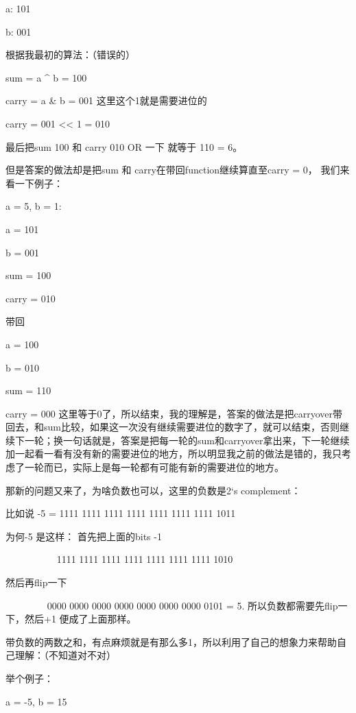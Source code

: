 \documentclass[9pt, b5paaper]{book}
\begin{document}
a: 101

b: 001

根据我最初的算法：（错误的）

sum = a \^{} b = 100

carry = a \& b = 001 这里这个1就是需要进位的

carry = 001 << 1 = 010

最后把sum 100 和 carry 010 OR 一下 就等于 110 = 6。

但是答案的做法却是把sum 和 carry在带回function继续算直至carry = 0， 我们来看一下例子：

a = 5, b = 1:

a = 101

b = 001

sum = 100

carry = 010

带回

a = 100

b = 010

sum = 110

carry = 000 这里等于0了，所以结束，我的理解是，答案的做法是把carryover带回去，和sum比较，如果这一次没有继续需要进位的数字了，就可以结束，否则继续下一轮；换一句话就是，答案是把每一轮的sum和carryover拿出来，下一轮继续加一起看一看有没有新的需要进位的地方，所以明显我之前的做法是错的，我只考虑了一轮而已，实际上是每一轮都有可能有新的需要进位的地方。

那新的问题又来了，为啥负数也可以，这里的负数是2‘s complement：

比如说 -5 = 1111 1111 1111 1111 1111 1111 1111 1011

为何-5 是这样： 首先把上面的bits -1

　　　　　 1111 1111 1111 1111 1111 1111 1111 1010

然后再flip一下

　　　　    0000 0000 0000 0000 0000 0000 0000 0101 = 5. 所以负数都需要先flip一下，然后+1 便成了上面那样。

带负数的两数之和，有点麻烦就是有那么多1，所以利用了自己的想象力来帮助自己理解：（不知道对不对）

举个例子：

a = -5, b = 15
\end{document}
